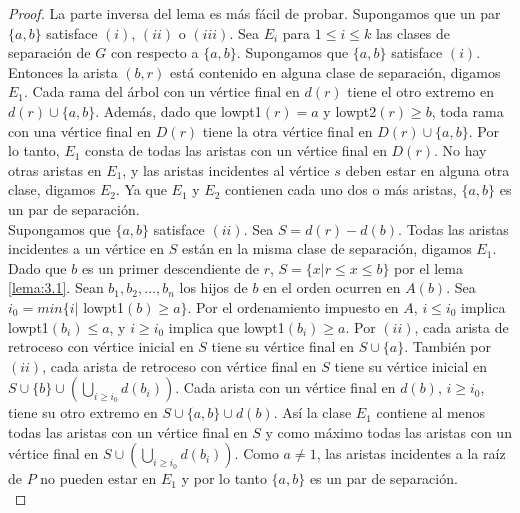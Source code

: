 \begin{proof}
La parte inversa del lema es más fácil de probar. Supongamos que un par $\{a, b\}$ satisface $\left(i\right)$, $\left(ii\right)$ o $\left(iii\right)$. Sea $E_{i}$ para $1 \leq i \leq k$ las clases de separación de $G$ con respecto a $\{a, b\}$. Supongamos que $\{a, b\}$ satisface $\left(i\right)$. Entonces la arista $\left(b, r\right)$ está contenido en alguna clase de separación, digamos $E_{1}$. Cada rama del árbol con un vértice final en $d\left(r\right)$ tiene el otro extremo en $d\left(r\right) \cup \{a, b\}$. Además, dado que lowpt1$\left(r\right) = a$ y lowpt2$\left(r\right) \geq b$, toda rama con una vértice final en $D\left(r\right)$ tiene la otra vértice final en $D\left(r\right) \cup \{a, b\}$. Por lo tanto, $E_{1}$ consta de todas las aristas con un vértice final en $D\left(r\right)$. No hay otras aristas en $E_{1}$, y las aristas incidentes al vértice $s$ deben estar en alguna otra clase, digamos $E_{2}$. Ya que $E_{1}$ y $E_{2}$ contienen cada uno dos o más aristas, $\{a, b\}$ es un par de separación.\\

Supongamos que $\{a, b\}$ satisface $\left(ii\right)$. Sea $S = d\left(r\right) - d\left(b\right)$. Todas las aristas incidentes a un vértice en $S$ están en la misma clase de separación, digamos $E_{1}$. Dado que $b$ es un primer descendiente de $r$, $S = \{x | r \leq x \le b\}$ por el lema \ref{lema:3.1}. Sean $b_{1}, b_{2}, \ldots, b_{n}$ los hijos de $b$ en el orden ocurren en $A\left(b\right)$. Sea $i_{0} = min\{i | $ lowpt1$\left(b\right) \geq a\}$. Por el ordenamiento impuesto en $A$, $i \le i_{0}$ implica lowpt1$\left(b_{i}\right) \le a$, y $i \geq i_{0}$ implica que lowpt1$\left(b_{i}\right) \geq a$. Por $\left(ii\right)$, cada arista de retroceso con vértice inicial en $S$ tiene su vértice final en $S \cup \{a\}$. También por $\left(ii\right)$, cada arista de retroceso con vértice final en $S$ tiene su vértice inicial en $S \cup \{b\} \cup \left(\bigcup_{i\geq i_{0}}d\left(b_{i}\right)\right)$. Cada arista con un vértice final en $d\left(b\right)$, $i \geq i_{0}$, tiene su otro extremo en $S \cup \{a, b\} \cup d\left(b\right)$. Así la clase $E_{1}$ contiene al menos todas las aristas con un vértice final en $S$ y como máximo todas las aristas con un vértice final en $S \cup (\bigcup_{i\geq i_{0}}d(b_{i}))$. Como $a \neq 1$, las aristas incidentes a la raíz de $P$ no pueden estar en $E_{1}$ y por lo tanto $\{a, b\}$ es un par de separación.\\


\end{proof}
